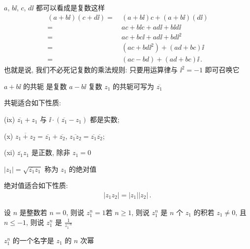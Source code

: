 \begin{remark}
    $a$, $b\ii$, $c$, $d\ii$ 都可以看成是复数\period 这样
    \begin{align*}
        (a + b \ii) (c + d \ii)
        = \  & (a + b \ii) c + (a + b \ii) (d \ii)  \\
        = \  & ac + b \ii c + a d \ii + b \ii d \ii \\
        = \  & ac + bc\ii + ad\ii + bd\ii^2         \\
        = \  & (ac + bd\ii^2) + (ad + bc)\ii        \\
        = \  & (ac - bd) + (ad + bc)\ii \period
    \end{align*}
    也就是说, 我们不必死记复数的乘法规则: 只要用运算律与 $\ii^2 = -1$ 即可召唤它\period
\end{remark}

\begin{definition}
    $a + b\ii$ 的共轭  是复数 $a - b\ii$ \period 复数 $z_1$ 的共轭可写为 $\overline{z_1}$\period
\end{definition}

\begin{proposition}
    共轭适合如下性质:

    (ix) $\overline{z_1} + z_1$ 与 $\ii \cdot (\overline{z_1} - z_1)$ 都是实数;

    (x) $\overline{z_1 + z_2} = \overline{z_1} + \overline{z_2}$, $\overline{z_1 z_2} = \overline{z_1} \overline{z_2}$;

    (xi) $\overline{z_1} z_1$ 是正数, 除非 $z_1 = 0$\period
\end{proposition}

\begin{definition}
    $|z_1| = \sqrt{\overline{z_1} z_1}$ 称为 $z_1$ 的绝对值 \period
\end{definition}

\begin{proposition}
    绝对值适合如下性质:
    \begin{align*}
        |z_1 z_2| = |z_1| |z_2| \period
    \end{align*}
\end{proposition}

\begin{definition}
    设 $n$ 是整数\period 若 $n=0$, 则说 $z_1^n = 1$\period 若 $n \geq 1$, 则说 $z_1^n$ 是 $n$ 个 $z_1$ 的积\period 若 $z_1 \neq 0$, 且 $n \leq -1$, 则说 $z_1^n$ 是 $\frac{1}{z_1^{-n}}$\period

    $z_1^n$ 的一个名字是 $z_1$ 的 $n$ 次幂 \period
\end{definition}

